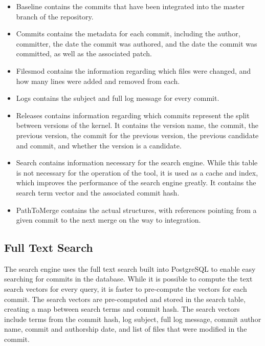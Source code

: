 \begin{itemize}
  \item

    Baseline contains the commits that have been integrated into the
    master branch of the repository.

  \item

    Commits contains the metadata for each commit, including the author,
    committer, the date the commit was authored, and the date the commit
    was committed, as well as the associated patch.

  \item

    Filesmod contains the information regarding which files were changed,
    and how many lines were added and removed from each.

  \item

    Logs contains the subject and full log message for every commit.

  \item

    Releases contains information regarding which commits represent the
    split between versions of the kernel. It contains the version name,
    the commit, the previous version, the commit for the previous
    version, the previous candidate and commit, and whether the version
    is a candidate.

  \item

    Search contains information necessary for the search engine. While
    this table is not necessary for the operation of the tool, it is
    used as a cache and index, which improves the performance of the
    search engine greatly. It contains the search term vector and the
    associated commit hash.

  \item

    PathToMerge contains the actual \mt{} structures, with
    references pointing from a given commit to the next merge on the way
    to integration.

\end{itemize}

\subsection{Full Text Search}\label{sub:full_text_search}

The search engine uses the full text search built into PostgreSQL to
enable easy searching for commits in the database. While it is possible
to compute the text search vectors for every query, it is faster to
pre-compute the vectors for each commit. %
The search vectors are
pre-computed and stored in the search table, creating a map between
search terms and commit hash. The search vectors include terms from the
commit hash, log subject, full log message, commit author name, commit
and authorship date, and list of files that were modified in the commit.

